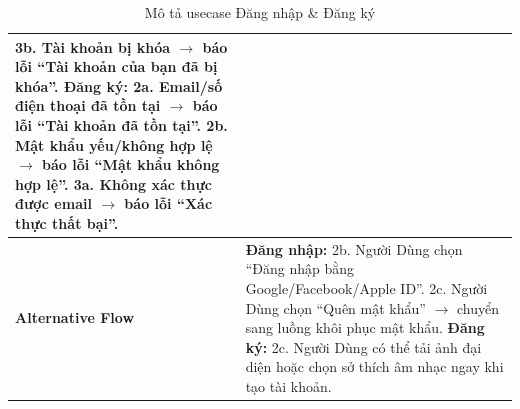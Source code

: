 \documentclass[a4paper]{article}
\begin{document}
\begin{table}[h!]
\begin{tabularx}{\textwidth}{|l|X|}
  3b. Tài khoản bị khóa $\rightarrow$ báo lỗi “Tài khoản của bạn đã bị khóa”.
  \textbf{Đăng ký:} \newline
  2a. Email/số điện thoại đã tồn tại $\rightarrow$ báo lỗi “Tài khoản đã tồn tại”. \newline
  2b. Mật khẩu yếu/không hợp lệ $\rightarrow$ báo lỗi “Mật khẩu không hợp lệ”. \newline
  3a. Không xác thực được email $\rightarrow$ báo lỗi “Xác thực thất bại”. \\ \hline
\textbf{Alternative Flow} 
& \textbf{Đăng nhập:} \newline
  2b. Người Dùng chọn “Đăng nhập bằng Google/Facebook/Apple ID”. \newline
  2c. Người Dùng chọn “Quên mật khẩu” $\rightarrow$ chuyển sang luồng khôi phục mật khẩu. \newline
  \textbf{Đăng ký:} \newline
  2c. Người Dùng có thể tải ảnh đại diện hoặc chọn sở thích âm nhạc ngay khi tạo tài khoản. \\ \hline
\end{tabularx}
\caption{Mô tả usecase Đăng nhập \& Đăng ký}
\end{table}
\end{document}
